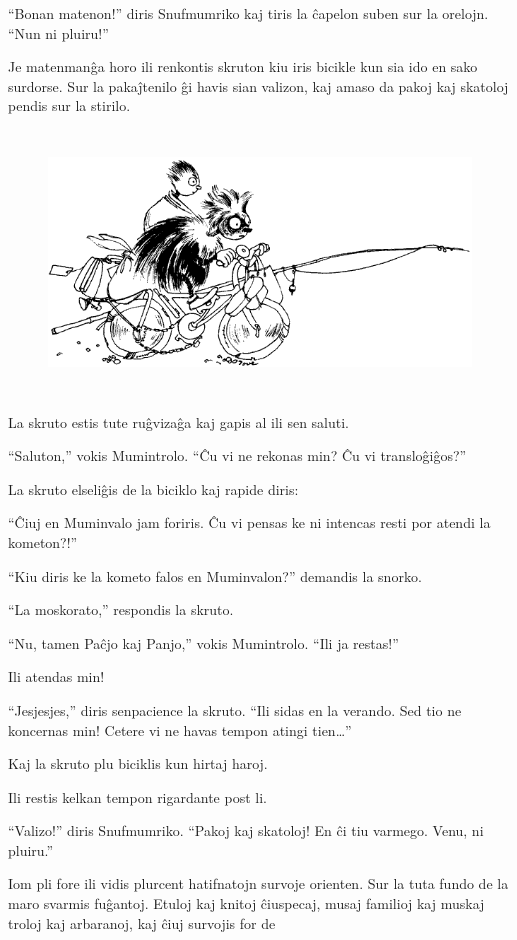 ``Bonan matenon!'' diris Snufmumriko kaj tiris la ĉapelon suben sur la orelojn. ``Nun ni pluiru!''

Je matenmanĝa horo ili renkontis skruton kiu iris bicikle kun sia ido en sako surdorse. Sur la pakaĵtenilo ĝi havis sian valizon, kaj amaso da pakoj kaj skatoloj pendis sur la stirilo.

\begin{figure}[htbp]
\centering
\includegraphics[width=400pt,height=198pt]{8-1.png}
\caption{}
\label{8-1}
\end{figure}

La skruto estis tute ruĝvizaĝa kaj gapis al ili sen saluti.

``Saluton,'' vokis Mumintrolo. ``Ĉu vi ne rekonas min? Ĉu vi transloĝiĝos?''

La skruto elseliĝis de la biciklo kaj rapide diris:

``Ĉiuj en Muminvalo jam foriris. Ĉu vi pensas ke ni intencas resti por atendi la kometon?!''

``Kiu diris ke la kometo falos en Muminvalon?'' demandis la snorko.

``La moskorato,'' respondis la skruto.

``Nu, tamen Paĉjo kaj Panjo,'' vokis Mumintrolo. ``Ili ja restas!''

Ili atendas min!

``Jesjesjes,'' diris senpacience la skruto. ``Ili sidas en la verando. Sed tio ne koncernas min! Cetere vi ne havas tempon atingi tien{\ldots}''

Kaj la skruto plu biciklis kun hirtaj haroj.

Ili restis kelkan tempon rigardante post li.

``Valizo!'' diris Snufmumriko. ``Pakoj kaj skatoloj! En ĉi tiu varmego. Venu, ni pluiru.''

Iom pli fore ili vidis plurcent hatifnatojn survoje orienten. Sur la tuta fundo de la maro svarmis fuĝantoj. Etuloj kaj knitoj ĉiuspecaj, musaj familioj kaj muskaj troloj kaj arbaranoj, kaj ĉiuj survojis for de

